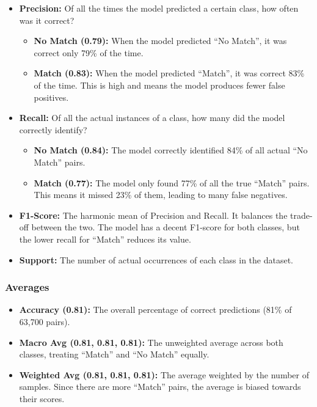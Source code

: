 \begin{itemize}
    \item \textbf{Precision:} Of all the times the model predicted a certain class, how often was it correct?
          \begin{itemize}
              \item \textbf{No Match (0.79):} When the model predicted ``No Match'', it was correct only 79\% of the time.
              \item \textbf{Match (0.83):} When the model predicted ``Match'', it was correct 83\% of the time. This is high and means the model produces fewer false positives.
          \end{itemize}

    \item \textbf{Recall:} Of all the actual instances of a class, how many did the model correctly identify?
          \begin{itemize}
              \item \textbf{No Match (0.84):} The model correctly identified 84\% of all actual ``No Match'' pairs.
              \item \textbf{Match (0.77):} The model only found 77\% of all the true ``Match'' pairs. This means it missed 23\% of them, leading to many false negatives.
          \end{itemize}

    \item \textbf{F1-Score:} The harmonic mean of Precision and Recall. It balances the trade-off between the two. The model has a decent F1-score for both classes, but the lower recall for ``Match'' reduces its value.

    \item \textbf{Support:} The number of actual occurrences of each class in the dataset.
\end{itemize}

\subsubsection*{Averages}

\begin{itemize}
    \item \textbf{Accuracy (0.81):} The overall percentage of correct predictions (81\% of 63,700 pairs).
    \item \textbf{Macro Avg (0.81, 0.81, 0.81):} The unweighted average across both classes, treating ``Match'' and ``No Match'' equally.
    \item \textbf{Weighted Avg (0.81, 0.81, 0.81):} The average weighted by the number of samples. Since there are more ``Match'' pairs, the average is biased towards their scores.
\end{itemize}

